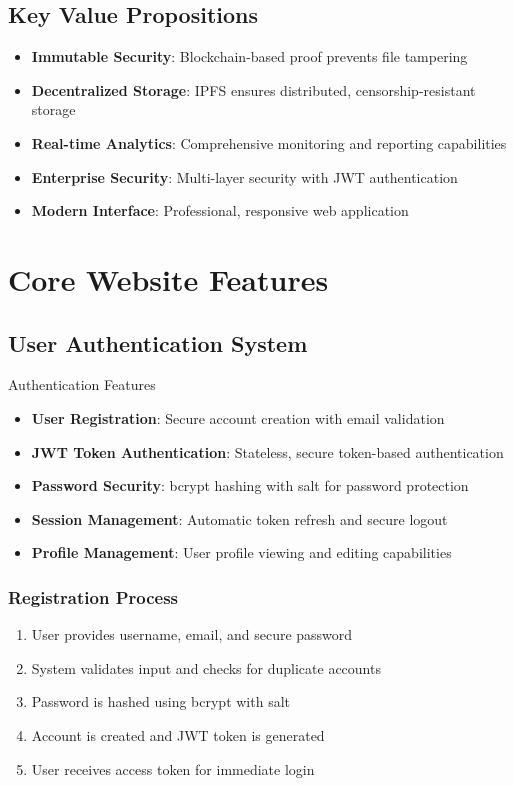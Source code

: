 \documentclass[11pt,a4paper]{article}
\begin{document}
\subsection{Key Value Propositions}
\begin{itemize}
    \item \textbf{\faShieldAlt\space Immutable Security}: Blockchain-based proof prevents file tampering
    \item \textbf{\faNetworkWired\space Decentralized Storage}: IPFS ensures distributed, censorship-resistant storage
    \item \textbf{\faChartBar\space Real-time Analytics}: Comprehensive monitoring and reporting capabilities
    \item \textbf{\faUserShield\space Enterprise Security}: Multi-layer security with JWT authentication
    \item \textbf{\faMobile\space Modern Interface}: Professional, responsive web application
\end{itemize}

\section{Core Website Features}

\subsection{User Authentication System}

\begin{featurebox}{\faUserCircle\space Authentication Features}
\begin{itemize}
    \item \textbf{User Registration}: Secure account creation with email validation
    \item \textbf{JWT Token Authentication}: Stateless, secure token-based authentication
    \item \textbf{Password Security}: bcrypt hashing with salt for password protection
    \item \textbf{Session Management}: Automatic token refresh and secure logout
    \item \textbf{Profile Management}: User profile viewing and editing capabilities
\end{itemize}
\end{featurebox}

\subsubsection{Registration Process}
\begin{enumerate}
    \item User provides username, email, and secure password
    \item System validates input and checks for duplicate accounts
    \item Password is hashed using bcrypt with salt
    \item Account is created and JWT token is generated
    \item User receives access token for immediate login
\end{enumerate}
\end{document}
